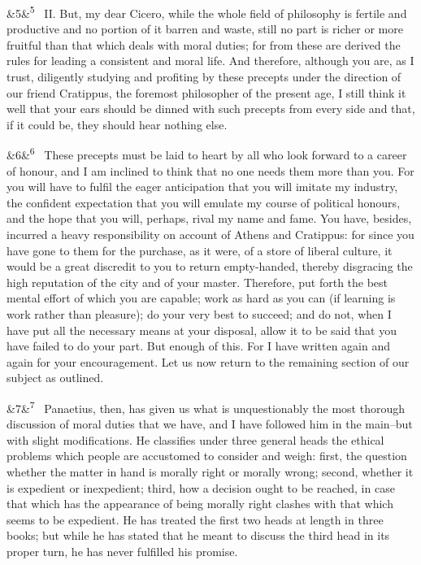 \documentclass[12pt]{article}
\newcommand{\para}[1][]{\par\noindent\ifx&#1&\else\textsuperscript{\footnotesize #1}~\fi}
\begin{document}
\para[5] II. But, my dear Cicero, while the whole field of philosophy is fertile and productive and no portion of it barren and waste, still no part is richer or more fruitful than that which deals with moral duties; for from these are derived the rules for leading a consistent and moral life. And therefore, although you are, as I trust, diligently studying and profiting by these precepts under the direction of our friend Cratippus, the foremost philosopher of the present age, I still think it well that your ears should be dinned with such precepts from every side and that, if it could be, they should hear nothing else.

\para[6] These precepts must be laid to heart by all who look forward to a career of honour, and I am inclined to think that no one needs them more than you. For you will have to fulfil the eager anticipation that you will imitate my industry, the confident expectation that you will emulate my course of political honours, and the hope that you will, perhaps, rival my name and fame. You have, besides, incurred a heavy responsibility on account of Athens and Cratippus: for since you have gone to them for the purchase, as it were, of a store of liberal culture, it would be a great discredit to you to return empty-handed, thereby disgracing the high reputation of the city and of your master. Therefore, put forth the best mental effort of which you are capable; work as hard as you can (if learning is work rather than pleasure); do your very best to succeed; and do not, when I have put all the necessary means at your disposal, allow it to be said that you have failed to do your part. But enough of this. For I have written again and again for your encouragement. Let us now return to the remaining section of our subject as outlined.

\para[7] Panaetius, then, has given us what is unquestionably the most thorough discussion of moral duties that we have, and I have followed him in the main--but with slight modifications. He classifies under three general heads the ethical problems which people are accustomed to consider and weigh: first, the question whether the matter in hand is morally right or morally wrong; second, whether it is expedient or inexpedient; third, how a decision ought to be reached, in case that which has the appearance of being morally right clashes with that which seems to be expedient. He has treated the first two heads at length in three books; but while he has stated that he meant to discuss the third head in its proper turn, he has never fulfilled his promise.
\end{document}
